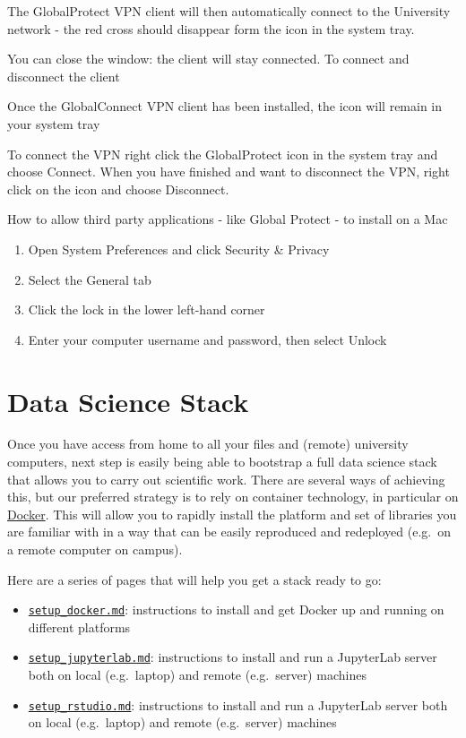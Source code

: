 \documentclass[]{book}
\providecommand{\tightlist}{%
  \setlength{\itemsep}{0pt}\setlength{\parskip}{0pt}}
\begin{document}
The GlobalProtect VPN client will then automatically connect to the
University network - the red cross should disappear form the icon in the
system tray.

You can close the window: the client will stay connected. To connect and
disconnect the client

Once the GlobalConnect VPN client has been installed, the icon will
remain in your system tray

To connect the VPN right click the GlobalProtect icon in the system tray
and choose Connect. When you have finished and want to disconnect the
VPN, right click on the icon and choose Disconnect.

How to allow third party applications - like Global Protect - to install
on a Mac

\begin{enumerate}
\def\labelenumi{\arabic{enumi}.}
\item
  Open System Preferences and click Security \& Privacy
\item
  Select the General tab
\item
  Click the lock in the lower left-hand corner
\item
  Enter your computer username and password, then select Unlock
\end{enumerate}

\chapter{Data Science Stack}\label{data-science-stack}

Once you have access from home to all your files and (remote) university
computers, next step is easily being able to bootstrap a full data
science stack that allows you to carry out scientific work. There are
several ways of achieving this, but our preferred strategy is to rely on
container technology, in particular on
\href{https://www.docker.com/}{Docker}. This will allow you to rapidly
install the platform and set of libraries you are familiar with in a way
that can be easily reproduced and redeployed (e.g.~on a remote computer
on campus).

Here are a series of pages that will help you get a stack ready to go:

\begin{itemize}
\tightlist
\item
  \href{setup_docker.md}{\texttt{setup\_docker.md}}: instructions to
  install and get Docker up and running on different platforms
\item
  \href{setup_jupyterlab.md}{\texttt{setup\_jupyterlab.md}}:
  instructions to install and run a JupyterLab server both on local
  (e.g.~laptop) and remote (e.g.~server) machines
\item
  \href{setup_rstudio.md}{\texttt{setup\_rstudio.md}}: instructions to
  install and run a JupyterLab server both on local (e.g.~laptop) and
  remote (e.g.~server) machines
\end{itemize}
\end{document}
